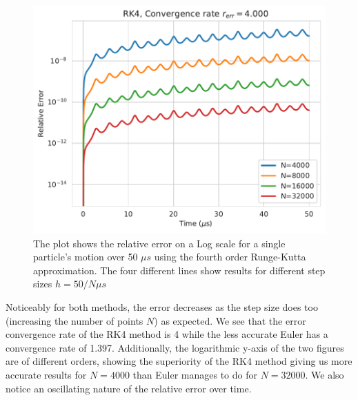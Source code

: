 \documentclass[english,notitlepage,reprint,nofootinbib]{revtex4-1}  %
\begin{document}
\begin{figure}[H]
    \centering
    \includegraphics[width=.5\textwidth]{../figures/relative_error_RK4_norm.pdf}
    \caption{The plot shows the relative error on a Log scale for a single particle's motion over 50 $\mu s$ using the fourth order Runge-Kutta approximation.
        The four different lines show results for different step sizes $h = 50/N \mu s$ }
    \label{fig:relative_error_RK4_norm}
\end{figure}
Noticeably for both methods, the error decreases as the step size does too (increasing the number of points $N$) as expected. We see that the error convergence rate of the RK4 method is 4 while the less accurate Euler has a convergence rate of 1.397. Additionally, the logarithmic y-axis of the two figures are of different orders, showing the superiority of the RK4 method giving us more accurate results for $N=4000$ than Euler manages to do for $N=32000$. We also notice an oscillating nature of the relative error over time.
\end{document}
